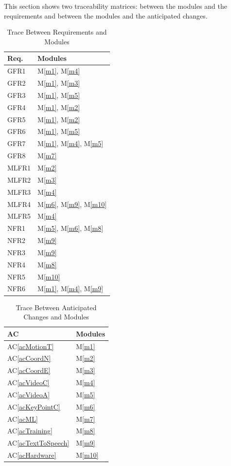 \documentclass[12pt, titlepage]{article}
\newcommand{\acref}[1]{AC\ref{#1}}
\newcommand{\mref}[1]{M\ref{#1}}
\begin{document}
This section shows two traceability matrices: between the modules and the
requirements and between the modules and the anticipated changes.

\begin{table}[H]
\centering
\begin{tabular}{p{} p{}}
\toprule
\textbf{Req.} & \textbf{Modules}\\
\midrule
GFR1 & \mref{m1}, \mref{m4}\\
GFR2 & \mref{m1}, \mref{m3}\\
GFR3 & \mref{m1}, \mref{m5}\\
GFR4 & \mref{m1}, \mref{m2}\\
GFR5 & \mref{m1}, \mref{m2}\\
GFR6 & \mref{m1}, \mref{m5}\\
GFR7 & \mref{m1}, \mref{m4}, \mref{m5}\\
GFR8 & \mref{m7}\\
MLFR1 & \mref{m2}\\
MLFR2 & \mref{m3}\\
MLFR3 & \mref{m4}\\
MLFR4 & \mref{m6}, \mref{m9}, \mref{m10}\\
MLFR5 & \mref{m4}\\
NFR1 & \mref{m5}, \mref{m6}, \mref{m8}\\
NFR2 & \mref{m9}\\
NFR3 & \mref{m9}\\
NFR4 & \mref{m8}\\
NFR5 & \mref{m10}\\
NFR6 & \mref{m1}, \mref{m4}, \mref{m9}\\

\bottomrule
\end{tabular}
\caption{Trace Between Requirements and Modules}
\label{TblRT}
\end{table}

\begin{table}[H]
\centering
\begin{tabular}{p{} p{}}
\toprule
\textbf{AC} & \textbf{Modules}\\
\midrule
\acref{acMotionT} & \mref{m1}\\
\acref{acCoordN} & \mref{m2}\\
\acref{acCoordE} & \mref{m3}\\
\acref{acVideoC} & \mref{m4}\\
\acref{acVideoA} & \mref{m5}\\
\acref{acKeyPointC} & \mref{m6}\\
\acref{acML} & \mref{m7}\\
\acref{acTraining} & \mref{m8}\\
\acref{acTextToSpeech} & \mref{m9}\\
\acref{acHardware} & \mref{m10}\\





\bottomrule
\end{tabular}
\caption{Trace Between Anticipated Changes and Modules}
\label{TblACT}
\end{table}
\end{document}
